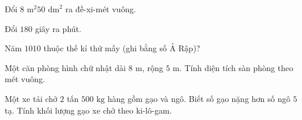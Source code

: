 \begin{ex} %
Đổi $8\text{ m}^2 50\text{ dm}^2$ ra đề-xi-mét vuông.
\end{ex}

\begin{ex} %
Đổi $180$ giây ra phút.
\end{ex}

\begin{ex} %
Năm $1010$ thuộc thế kỉ thứ mấy (ghi bằng số Ả Rập)?
\end{ex}

\begin{ex} %
Một căn phòng hình chữ nhật dài $8\text{ m}$, rộng $5\text{ m}$. Tính diện tích sàn phòng theo mét vuông.
\end{ex}

\begin{ex} %
Một xe tải chở $2$ tấn $500\text{ kg}$ hàng gồm gạo và ngô. Biết số gạo nặng hơn số ngô $5$ tạ. Tính khối lượng gạo xe chở theo ki-lô-gam.
\end{ex}
